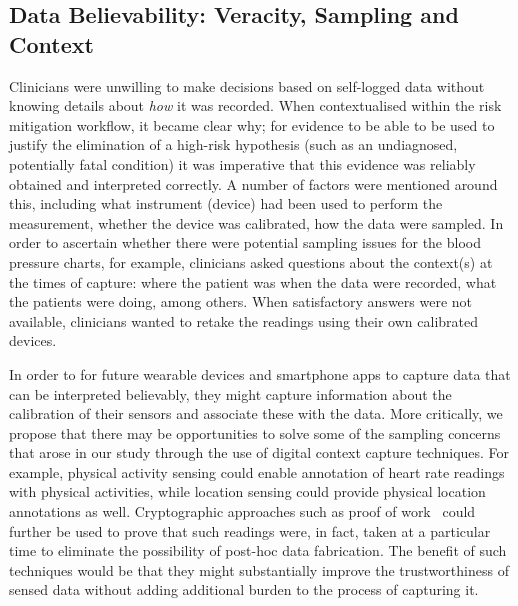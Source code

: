 \documentclass{sigchi}
\begin{document}


\subsection{Data Believability: Veracity, Sampling and Context}

Clinicians were unwilling to make decisions based on self-logged data without knowing details about \emph{how} it was recorded. When contextualised within the risk mitigation workflow, it became clear why; for evidence to be able to be used to justify the elimination of a high-risk hypothesis (such as an undiagnosed, potentially fatal condition) it was imperative that this evidence was reliably obtained and interpreted correctly.  A number of factors were mentioned around this, including what instrument (device) had been used to perform the measurement, whether the device was calibrated, how the data were sampled.  In order to ascertain whether there were potential sampling issues for the blood pressure charts, for example, clinicians asked questions about the context(s) at the times of capture: where the patient was when the data were recorded, what the patients were doing, among others.  When satisfactory answers were not available, clinicians wanted to retake the readings using their own calibrated devices.

In order to for future wearable devices and smartphone apps to capture data that can be interpreted believably, they might capture information about the calibration of their sensors and associate these with the data.   More critically, we propose that there may be opportunities to solve some of the sampling concerns that arose in our study through the use of digital context capture techniques.  For example, physical activity sensing could enable annotation of heart rate readings with physical activities, while location sensing could provide physical location annotations as well.  Cryptographic approaches such as proof of work~\cite{clark2012commitcoin} could further be used to prove that such readings were, in fact, taken at a particular time to eliminate the possibility of post-hoc data fabrication.  The benefit of such techniques would be that they might substantially improve the trustworthiness of sensed data without adding additional burden to the process of capturing it.
\end{document}
